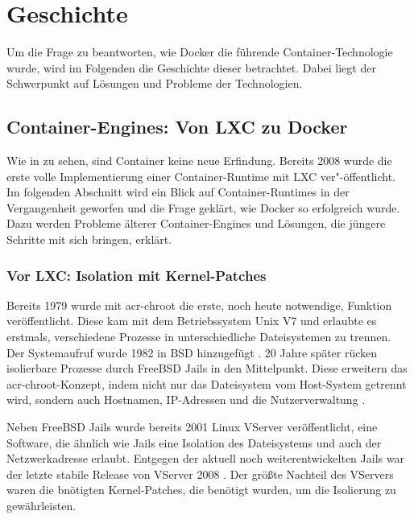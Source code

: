 \chapter{Geschichte}
\label{chap:geschichte}
Um die Frage zu beantworten, wie Docker die führende Container-Technologie wurde, wird im Folgenden die Geschichte dieser betrachtet. Dabei liegt der Schwerpunkt auf Lösungen und Probleme der Technologien.
 
\section{Container-Engines: Von LXC zu Docker}
\label{sec:lxc2containerd}
Wie in  zu sehen, sind Container keine neue Erfindung. Bereits 2008 wurde die erste volle Implementierung einer Container-Runtime mit LXC ver"-öffentlicht. Im folgenden Abschnitt wird ein Blick auf Container-Runtimes in der Vergangenheit geworfen und die Frage geklärt, wie Docker so erfolgreich wurde. Dazu werden Probleme älterer Container-Engines und Lösungen, die jüngere Schritte mit sich bringen, erklärt.

\subsection{Vor LXC: Isolation mit Kernel-Patches}
\label{sec:geschichteVorLXC}

Bereits 1979 wurde mit \gls{acr-chroot} die erste, noch heute notwendige, Funktion veröffentlicht. Diese kam mit dem Betriebssystem Unix V7 und erlaubte es erstmals, verschiedene Prozesse in unterschiedliche Dateisystemen zu trennen. Der Systemaufruf wurde 1982 in BSD hinzugefügt \citep{ABriefHistoryofContainers:fromthe1970sto2017}. 20 Jahre später rücken isolierbare Prozesse durch FreeBSD Jails in den Mittelpunkt. Diese erweitern das \Gls{acr-chroot}-Konzept, indem nicht nur das Dateisystem vom Host-System getrennt wird, sondern auch Hostnamen, IP-Adressen und die Nutzerverwaltung \citep{FreeBSDHandbook}. 

Neben FreeBSD Jails wurde bereits 2001 Linux VServer veröffentlicht, eine Software, die ähnlich wie Jails eine Isolation des Dateisystems und auch der Netzwerkadresse erlaubt. Entgegen der aktuell noch weiterentwickelten Jails war der letzte stabile Release von VServer 2008 \citep{PaperLinuxVServer}. Der größte Nachteil des VServers waren die bnötigten Kernel-Patches, die benötigt wurden, um die Isolierung zu gewährleisten.

